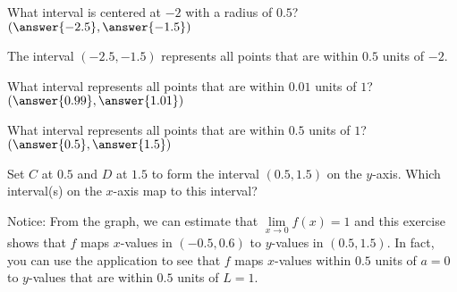 \documentclass{ximera}
\begin{document}
\begin{exercise}
    \begin{question}
    	What interval is centered at $-2$ with a radius of $ 0.5$? $\left( \answer{-2.5}, \answer{-1.5}\right)$
    	\begin{feedback}
    		The interval $(-2.5, -1.5)$ represents all points that are within $0.5$ units of $-2$.
    	\end{feedback}
    \end{question}
    \begin{question}
    	What interval represents all points that are within $0.01$ units of $1$?  $\left( \answer{0.99}, \answer{1.01} \right)$
    \end{question}
 	\begin{question}
 		What interval represents all points that are within $0.5$ units of $1$?  $\left( \answer{0.5}, \answer{1.5}\right)$
		\begin{question}
 			Set $C$ at $0.5$ and $D$ at $1.5$ to form the interval $(0.5, 1.5)$ on the $y$-axis.  Which interval(s) on the $x$-axis map to this interval?
 			\begin{selectAll}
 			\end{selectAll}
 		    \begin{feedback}
 		    	Notice: From the graph, we can estimate that $\lim\limits_{x \to 0}f(x)=1$ and this exercise shows that $f$ maps $x$-values in $(-0.5, 0.6)$ to $y$-values in $(0.5, 1.5)$.  In fact, you can use the application to see that $f$ maps $x$-values within $0.5$ units of $a=0$ to $y$-values that are within $0.5$ units of $L=1$.
 		    \end{feedback}
  		\end{question}	
 	\end{question}
    \end{exercise}
\end{document}
